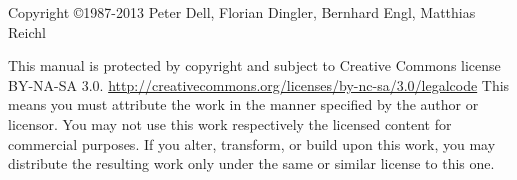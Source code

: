 \thispagestyle{empty}

\null
\vfill

\noindent Copyright \copyright 1987-2013 Peter Dell, Florian Dingler,
Bernhard Engl, Matthias Reichl
\newline

\noindent
This manual is protected by copyright and subject to Creative Commons license\linebreak
BY-NA-SA 3.0.\newline
\url{http://creativecommons.org/licenses/by-nc-sa/3.0/legalcode}\newline
\newline
This means you must attribute the work in the manner specified by the author or
licensor. You may not use this work respectively the licensed content for
commercial purposes. If you alter, transform, or build upon this work, you may
distribute the resulting work only under the same or similar license to this
one.
